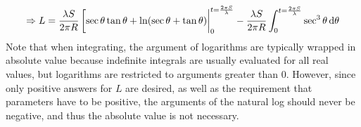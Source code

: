 \begin{equation*}
    \Rightarrow L = \frac{\lambda S}{2\pi R}\eval[\sec{\theta}\tan{\theta}+\ln(\sec{\theta}+\tan{\theta})|_0^{t =\frac{2\pi S}{\lambda}} - \frac{\lambda S}{2\pi R}\int_0^{t =\frac{2\pi S}{\lambda}}\sec^3{\theta} \dd{\theta}
\end{equation*}
Note that when integrating, the argument of logarithms are typically wrapped in absolute value because indefinite integrals are usually evaluated for all real values, but logarithms are restricted to arguments greater than 0. However, since only positive answers for $L$ are desired, as well as the requirement that parameters have to be positive, the arguments of the natural log should never be negative, and thus the absolute value is not necessary.

